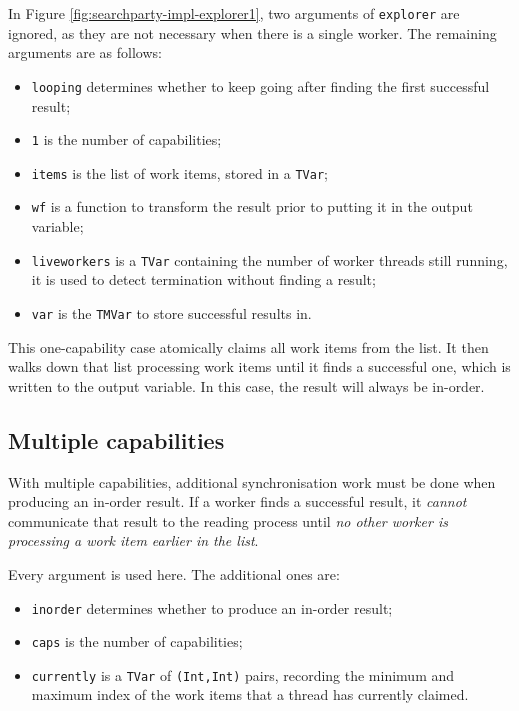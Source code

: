 In Figure \ref{fig:searchparty-impl-explorer1}, two arguments of
\verb|explorer| are ignored, as they are not necessary when there is a
single worker. The remaining arguments are as follows:

\begin{itemize}
  \item \verb|looping| determines whether to keep going after finding
    the first successful result;

  \item \verb|1| is the number of capabilities;

  \item \verb|items| is the list of work items, stored in a
    \verb|TVar|;

  \item \verb|wf| is a function to transform the result prior to
    putting it in the output variable;

  \item \verb|liveworkers| is a \verb|TVar| containing the number of
    worker threads still running, it is used to detect termination
    without finding a result;

  \item \verb|var| is the \verb|TMVar| to store successful results
    in.
\end{itemize}

This one-capability case atomically claims all work items from the
list. It then walks down that list processing work items until it
finds a successful one, which is written to the output variable. In
this case, the result will always be in-order.

\subsection{Multiple capabilities}
\label{sec:searchparty-impl-multi}

With multiple capabilities, additional synchronisation work must be
done when producing an in-order result. If a worker finds a successful
result, it \textit{cannot} communicate that result to the reading
process until \textit{no other worker is processing a work item
  earlier in the list}.

Every argument is used here. The additional ones are:

\begin{itemize}
  \item \verb|inorder| determines whether to produce an in-order
    result;

  \item \verb|caps| is the number of capabilities;

  \item \verb|currently| is a \verb|TVar| of \verb|(Int,Int)| pairs,
    recording the minimum and maximum index of the work items that a
    thread has currently claimed.
\end{itemize}

